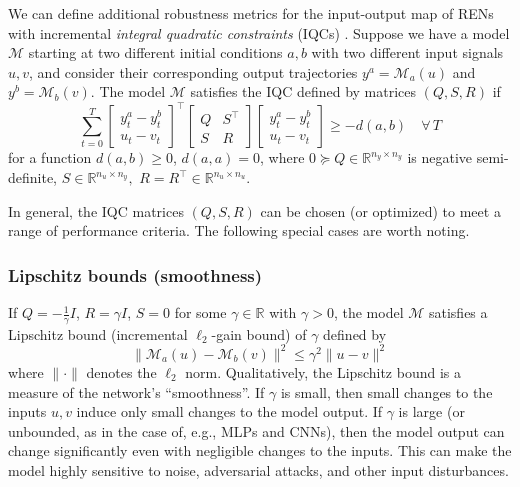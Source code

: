 We can define additional robustness metrics for the input-output map of RENs with incremental \textit{integral quadratic constraints} (IQCs) \cite{Megretski+Rantzer1997}. Suppose we have a model $\mathcal{M}$ starting at two different initial conditions $a,b$ with two different input signals $u, v$, and consider their corresponding output trajectories $y^a = \mathcal{M}_a(u)$ and $y^b = \mathcal{M}_b(v).$ The model $\mathcal{M}$ satisfies the IQC defined by matrices $(Q, S, R)$ if
\begin{equation}
    \sum_{t=0}^T
    \begin{bmatrix}
        y^a_t - y^b_t \\ u_t - v_t
    \end{bmatrix}^\top
    \begin{bmatrix}
        Q & S^\top \\ S & R
    \end{bmatrix}
    \begin{bmatrix}
        y^a_t - y^b_t \\ u_t - v_t
    \end{bmatrix} 
    \ge -d(a,b)
    \quad \forall \, T
\end{equation}
for a function $d(a,b) \ge 0$, $d(a,a) = 0$, where $0 \succeq Q \in \mathbb{R}^{n_y\times n_y}$ is negative semi-definite, $S\in\mathbb{R}^{n_u\times n_y},$ $R=R^\top \in \mathbb{R}^{n_u\times n_u}.$ 

In general, the IQC matrices $(Q,S,R)$ can be chosen (or optimized) to meet a range of performance criteria. The following special cases are worth noting.

\subsubsection{Lipschitz bounds (smoothness)} \label{sec:robustness-lipschitz}
If $Q = -\frac{1}{\gamma}I$, $R = \gamma I$, $S = 0$ for some $\gamma \in \mathbb{R}$ with $\gamma > 0$, the model $\mathcal{M}$ satisfies a Lipschitz bound (incremental $\ell_2$-gain bound) of $\gamma$ defined by
\begin{equation}
\|\mathcal{M}_a(u) - \mathcal{M}_b(v)\|^2 \le \gamma^2 \|u - v\|^2
\end{equation}
where $\|\cdot\|$ denotes the $\ell_2$ norm. Qualitatively, the Lipschitz bound is a measure of the network's ``smoothness''. If $\gamma$ is small, then small changes to the inputs $u,v$ induce only small changes to the model output. If $\gamma$ is large (or unbounded, as in the case of, e.g., MLPs and CNNs), then the model output can change significantly even with negligible changes to the inputs. This can make the model highly sensitive to noise, adversarial attacks, and other input disturbances.

